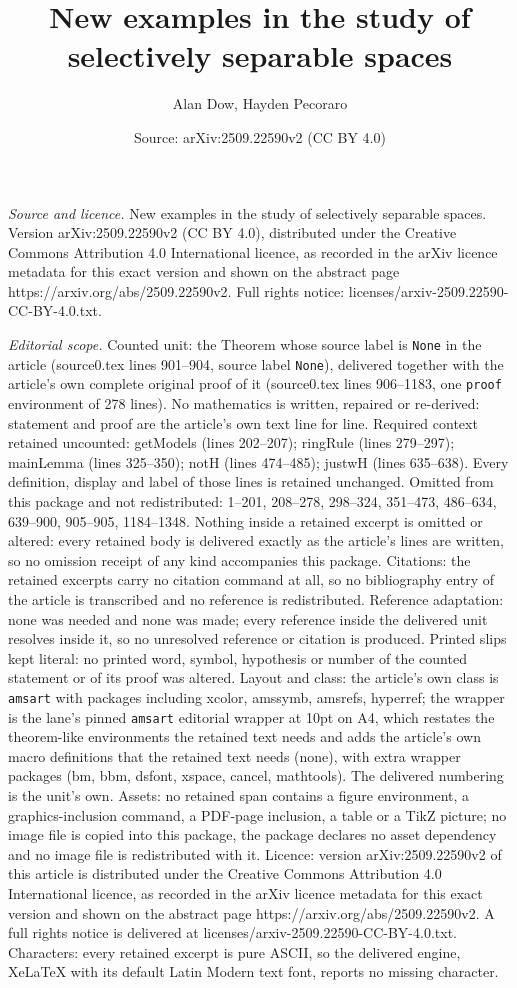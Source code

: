 \documentclass[10pt,a4paper]{amsart}
\title[New examples in the study of selectively separable spaces]{New examples in the study of selectively separable spaces}
\author{Alan Dow, Hayden Pecoraro}
\date{Source: arXiv:2509.22590v2 (CC BY 4.0)}
\begin{document}
\maketitle

\noindent\emph{Source and licence.} New examples in the study of selectively separable spaces. Version arXiv:2509.22590v2 (CC BY 4.0), distributed under the Creative Commons Attribution 4.0 International licence, as recorded in the arXiv licence metadata for this exact version and shown on the abstract page https://arxiv.org/abs/2509.22590v2. Full rights notice: licenses/arxiv-2509.22590-CC-BY-4.0.txt.\par\smallskip

\noindent\textit{Editorial scope.} Counted unit: the Theorem whose source label is \texttt{None} in the article (source0.tex lines 901--904, source label \texttt{None}), delivered together with the article's own complete original proof of it (source0.tex lines 906--1183, one \texttt{proof} environment of 278 lines). No mathematics is written, repaired or re-derived: statement and proof are the article's own text line for line. Required context retained uncounted: getModels (lines 202--207); ringRule (lines 279--297); mainLemma (lines 325--350); notH (lines 474--485); justwH (lines 635--638). Every definition, display and label of those lines is retained unchanged. Omitted from this package and not redistributed: 1--201, 208--278, 298--324, 351--473, 486--634, 639--900, 905--905, 1184--1348. Nothing inside a retained excerpt is omitted or altered: every retained body is delivered exactly as the article's lines are written, so no omission receipt of any kind accompanies this package. Citations: the retained excerpts carry no citation command at all, so no bibliography entry of the article is transcribed and no reference is redistributed. Reference adaptation: none was needed and none was made; every reference inside the delivered unit resolves inside it, so no unresolved reference or citation is produced. Printed slips kept literal: no printed word, symbol, hypothesis or number of the counted statement or of its proof was altered. Layout and class: the article's own class is \texttt{amsart} with packages including xcolor, amssymb, amsrefs, hyperref; the wrapper is the lane's pinned \texttt{amsart} editorial wrapper at 10pt on A4, which restates the theorem-like environments the retained text needs and adds the article's own macro definitions that the retained text needs (none), with extra wrapper packages (bm, bbm, dsfont, xspace, cancel, mathtools). The delivered numbering is the unit's own. Assets: no retained span contains a figure environment, a graphics-inclusion command, a PDF-page inclusion, a table or a TikZ picture; no image file is copied into this package, the package declares no asset dependency and no image file is redistributed with it. Licence: version arXiv:2509.22590v2 of this article is distributed under the Creative Commons Attribution 4.0 International licence, as recorded in the arXiv licence metadata for this exact version and shown on the abstract page https://arxiv.org/abs/2509.22590v2. A full rights notice is delivered at licenses/arxiv-2509.22590-CC-BY-4.0.txt. Characters: every retained excerpt is pure ASCII, so the delivered engine, XeLaTeX with its default Latin Modern text font, reports no missing character.
\end{document}
